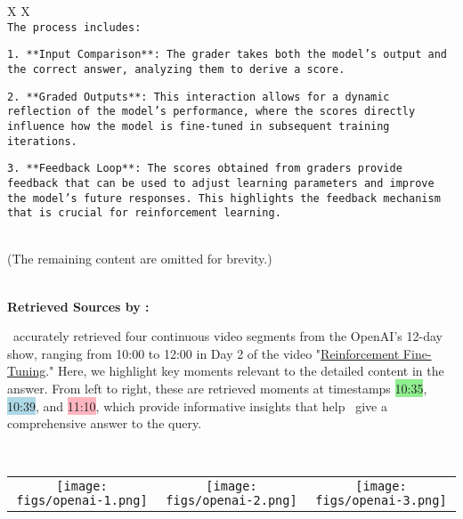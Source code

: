 \begin{table*}[t]
\begin{tabularx}{\textwidth}{X X}
\\

\texttt{The process includes:}

\texttt{1. **Input Comparison**: The grader takes both the model’s output and the correct answer, analyzing them to derive a score.}

\texttt{2. **Graded Outputs**: This interaction allows for a dynamic reflection of the model's performance, where the scores directly influence how the model is fine-tuned in subsequent training iterations.}

\texttt{3. **Feedback Loop**: The scores obtained from graders provide feedback that can be used to adjust learning parameters and improve the model’s future responses. This highlights the feedback mechanism that is crucial for reinforcement learning.}

\\

(The remaining content are omitted for brevity.)

\\

\midrule
\textbf{Retrieved Sources by \model:}

\model\ accurately retrieved four continuous video segments from the OpenAI's 12-day show, ranging from 10:00 to 12:00 in Day 2 of the video "\href{https://www.youtube.com/watch?v=yCIYS9fx56U}{Reinforcement Fine-Tuning}." Here, we highlight key moments relevant to the detailed content in the answer. From left to right, these are retrieved moments at timestamps \colorbox{lightgreen}{10:35}, \colorbox{lightblue}{10:39}, and \colorbox{lightpink}{11:10}, which provide informative insights that help \model\ give a comprehensive answer to the query.

\\

\begin{tabular}{ccc}
    {\texttt{[image: figs/openai-1.png]}} &
    {\texttt{[image: figs/openai-2.png]}} &
    {\texttt{[image: figs/openai-3.png]}} \\
\end{tabular}

\\

\bottomrule

\end{tabularx}
\vspace{-0.2in}
\end{table*}
